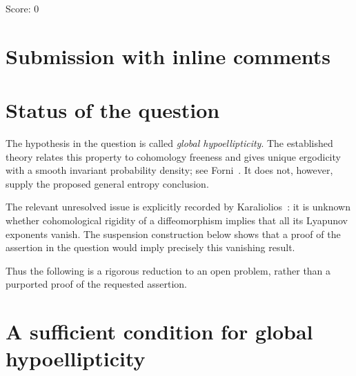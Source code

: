 \documentclass[11pt]{article}
\theoremstyle{definition}
\theoremstyle{remark}
\begin{document}
\noindent Score: 0
\newpage
\section{Submission with inline comments}


\begin{abstract}
A complete proof of the proposed assertion is not known in the stated
generality. In fact, the assertion would settle the open problem of
vanishing Lyapunov exponents for cohomologically rigid diffeomorphisms.
We give a complete proof of this reduction, explaining why the usual
structural results about globally hypoelliptic vector fields do not
supply the requested conclusion. 

\end{abstract}

\section{Status of the question}

The hypothesis in the question is called \emph{global hypoellipticity}.
The established theory relates this property to cohomology freeness and
gives unique ergodicity with a smooth invariant probability density;
see Forni~\cite[Proposition~2.4 and Theorem~3.10]{Forni}.
It does not, however, supply the proposed general entropy conclusion.

The relevant unresolved issue is explicitly recorded by
Karaliolios~\cite[Introduction, p.~6]{Karaliolios}: it is unknown whether
cohomological rigidity of a diffeomorphism implies that all its Lyapunov
exponents vanish. The suspension construction below shows that a proof
of the assertion in the question would imply precisely this vanishing
result.

Thus the following is a rigorous reduction to an open problem, rather
than a purported proof of the requested assertion.

\section{A sufficient condition for global hypoellipticity}
\end{document}
